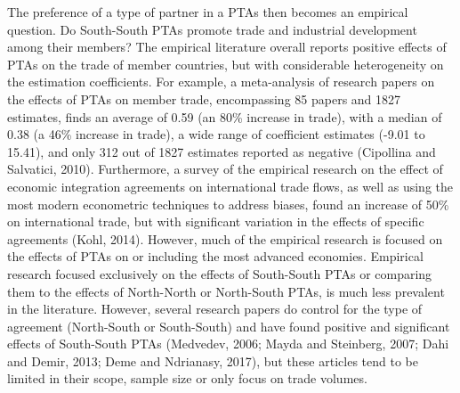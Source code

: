 The preference of a type of partner in a PTAs then becomes an empirical
question. Do South-South PTAs promote trade and industrial development
among their members? The empirical literature overall reports positive
effects of PTAs on the trade of member countries, but with considerable
heterogeneity on the estimation coefficients. For example, a
meta-analysis of research papers on the effects of PTAs on member trade,
encompassing 85 papers and 1827 estimates, finds an average of 0.59 (an
80\% increase in trade), with a median of 0.38 (a 46\% increase in
trade), a wide range of coefficient estimates (-9.01 to 15.41), and only
312 out of 1827 estimates reported as negative (Cipollina and Salvatici,
2010). Furthermore, a survey of the empirical research on the effect of
economic integration agreements on international trade flows, as well as
using the most modern econometric techniques to address biases, found an
increase of 50\% on international trade, but with significant variation
in the effects of specific agreements (Kohl, 2014). However, much of the
empirical research is focused on the effects of PTAs on or including the
most advanced economies. Empirical research focused exclusively on the
effects of South-South PTAs or comparing them to the effects of
North-North or North-South PTAs, is much less prevalent in the
literature. However, several research papers do control for the type of
agreement (North-South or South-South) and have found positive and
significant effects of South-South PTAs (Medvedev, 2006; Mayda and
Steinberg, 2007; Dahi and Demir, 2013; Deme and Ndrianasy, 2017), but
these articles tend to be limited in their scope, sample size or only
focus on trade volumes.